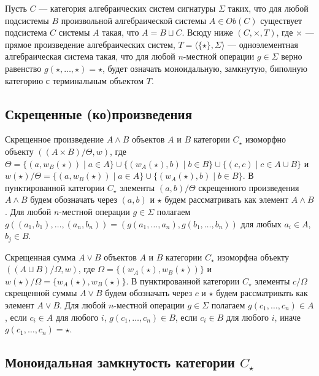\documentclass[a4paper,12pt]{article}
\begin{document}
Пусть $C$ --- категория алгебраических систем сигнатуры $\Sigma$ таких, что для любой подсистемы $B$ произвольной алгебраической системы $A \in Ob(C)$ существует подсистема $C$ системы $A$ такая, что $A = B \sqcup C$. Всюду ниже $(C, \times, T)$, где $\times$ --- прямое произведение алгебраических систем, $T = \langle \{\star\}, \Sigma \rangle$ --- одноэлементная алгебраическая система такая, что для любой $n$-местной операции $g \in \Sigma$ верно равенство $g(\star,\ldots,\star) = \star$, будет означать моноидальную, замкнутую, биполную категорию с терминальным объектом $T$. 

\subsection{Скрещенные (ко)произведения}

Скрещенное произведение $A \wedge B$ объектов $A$ и $B$ категории $C_\star$ изоморфно объекту $((A \times B)/\Theta,w)$, где $\Theta = \{(a,w_B(\star)) \mid a \in A\} \cup \{(w_A(\star),b) \mid b \in B\} \cup \{(c,c) \mid c \in A \cup B\}$ и $w(\star)/\Theta = \{(a,w_B(\star)) \mid a \in A\} \cup \{(w_A(\star),b) \mid b \in B\}$. В пунктированной категории $C_\star$ элементы $(a,b)/\Theta$ скрещенного произведения $A \wedge B$ будем обозначать через $(a,b)$ и $\star$ будем рассматривать как элемент $A \wedge B$. Для любой $n$-местной операции $g \in \Sigma$ полагаем $g((a_1,b_1),\ldots,(a_n,b_n)) = (g(a_1,\ldots,a_n),g(b_1,\ldots,b_n))$ для любых $a_i \in A$, $b_j \in B$. 

Скрещенная сумма $A \vee B$ объектов $A$ и $B$ категории $C_\star$ изоморфна объекту $((A \sqcup B)/\Omega,w)$, где $\Omega = \{(w_A(\star),w_B(\star))\}$ и $w(\star)/\Omega = \{w_A(\star),w_B(\star)\}$. В пунктированной категории $C_\star$ элементы $c/\Omega$ скрещенной суммы $A \vee B$ будем обозначать через $c$ и $\star$ будем рассматривать как элемент $A \vee B$. Для любой $n$-местной операции $g \in \Sigma$ полагаем $g(c_1,\ldots,c_n) \in A$, если $c_i \in A$ для любого $i$, $g(c_1,\ldots,c_n) \in B$, если $c_i \in B$ для любого $i$, иначе $g(c_1,\ldots,c_n) = \star$.

\subsection{Моноидальная замкнутость категории $C_\star$}
\end{document}
